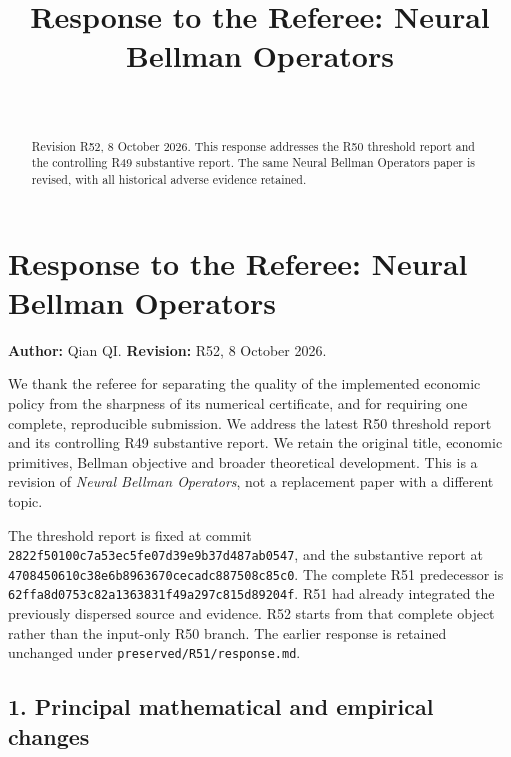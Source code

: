 \documentclass[ecta,nameyear,draft]{econsocart}
\begin{document}
\begin{frontmatter}
\title{Response to the Referee: Neural Bellman Operators}
\begin{aug}
\author[id=au1,addressref={add1}]{~}
\address[id=add1]{Peking University}
\end{aug}
\begin{abstract}Revision R52, 8 October 2026. This response addresses the R50 threshold report and the controlling R49 substantive report. The same Neural Bellman Operators paper is revised, with all historical adverse evidence retained.\end{abstract}
\end{frontmatter}
\hypertarget{response-to-the-referee-neural-bellman-operators}{%
\section{Response to the Referee: Neural Bellman
Operators}\label{response-to-the-referee-neural-bellman-operators}}

\textbf{Author:} Qian QI. \textbf{Revision:} R52, 8 October 2026.

We thank the referee for separating the quality of the implemented
economic policy from the sharpness of its numerical certificate, and for
requiring one complete, reproducible submission. We address the latest
R50 threshold report and its controlling R49 substantive report. We
retain the original title, economic primitives, Bellman objective and
broader theoretical development. This is a revision of \emph{Neural
Bellman Operators}, not a replacement paper with a different topic.

The threshold report is fixed at commit
\nolinkurl{2822f50100c7a53ec5fe07d39e9b37d487ab0547}, and the substantive
report at \nolinkurl{4708450610c38e6b8963670cecadc887508c85c0}. The
complete R51 predecessor is
\nolinkurl{62ffa8d0753c82a1363831f49a297c815d89204f}. R51 had already
integrated the previously dispersed source and evidence. R52 starts from
that complete object rather than the input-only R50 branch. The earlier
response is retained unchanged under \nolinkurl{preserved/R51/response.md}.

\hypertarget{principal-mathematical-and-empirical-changes}{%
\subsection{1. Principal mathematical and empirical
changes}\label{principal-mathematical-and-empirical-changes}}
\end{document}
